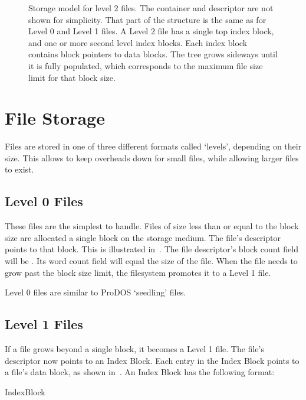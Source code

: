 \begin{figure}
 \centering
 

 \caption[Level 2 file structure]{\label{fig:file-level2} Storage
   model for level 2 files. The container and descriptor are not shown
   for simplicity. That part of the structure is the same as for Level
   0 and Level 1 files. A Level 2 file has a single top index block,
   and one or more second level index blocks. Each index block
   contains \glspl{block pointer} to data blocks. The tree grows
   sideways until it is fully populated, which corresponds to the
   maximum file size limit for that block size.}
\end{figure}


\section{File Storage}

Files are stored in one of three different formats called ‘levels’, depending
on their size. This allows to keep overheads down for small files, while
allowing larger files to exist.

\subsection{Level 0 Files}

These files are the simplest to handle. Files of size less than or
equal to the block size are allocated a single block on the storage
medium. The file's \gls{descriptor} points to that block. This is
illustrated in~. The file descriptor's block
count field will be . Its word count field will equal the size
of the file. When the file needs to grow past the block size limit,
the filesystem promotes it to a Level 1 file.

Level 0 files are similar to ProDOS ‘seedling’ files.

\subsection{Level 1 Files}

If a file grows beyond a single block, it becomes a Level 1 file. The
file's \gls{descriptor} now points to an Index Block. Each entry in
the Index Block points to a file's data block, as shown
in~. An Index Block has the following format:

\begin{datastructure}[Offset]{IndexBlock}

\end{datastructure}


